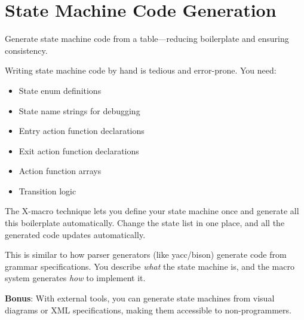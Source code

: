 \section{State Machine Code Generation}

Generate state machine code from a table---reducing boilerplate and ensuring consistency.

Writing state machine code by hand is tedious and error-prone. You need:
\begin{itemize}
    \item State enum definitions
    \item State name strings for debugging
    \item Entry action function declarations
    \item Exit action function declarations
    \item Action function arrays
    \item Transition logic
\end{itemize}

The X-macro technique lets you define your state machine once and generate all this boilerplate automatically. Change the state list in one place, and all the generated code updates automatically.

This is similar to how parser generators (like yacc/bison) generate code from grammar specifications. You describe \textit{what} the state machine is, and the macro system generates \textit{how} to implement it.

\textbf{Bonus}: With external tools, you can generate state machines from visual diagrams or XML specifications, making them accessible to non-programmers.

